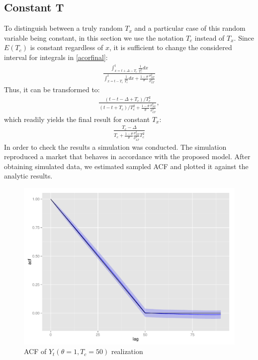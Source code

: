 \documentclass[12pt]{article}
\begin{document}
\subsection{Constant T}
To distinguish between a truly random $T_x$ and a particular case of this random variable being constant, in this section we use the notation $T_c$ instead of $T_x$. Since $E(T_c)$ is constant regardless of $x$, it is sufficient to change the considered interval for integrals in \eqref{acorfinal}:
\begin{equation*}
\begin{gathered}
\frac{\int_{x=t+\Delta-T_c}^{t}\frac{1}{T_c^2}dx}{\int_{x=t-T_c}^{t}\frac{1}{T_c^2}dx+\frac{1-\theta}{\theta}\frac{\sigma^2_{NT}}{\sigma^2_{LT}}}
\end{gathered}
\end{equation*}
Thus, it can be transformed to:
\begin{equation*}
\begin{gathered}
\frac{(t-t-\Delta+T_c)/T_c^2}{(t-t+T_c)/T_c^2+\frac{1-\theta}{\theta}\frac{\sigma^2_{NT}}{\sigma^2_{LT}}},
\end{gathered}
\end{equation*}
which readily yields the final result for constant $T_x$:
\begin{equation}\label{acorconst}
\begin{gathered}
\frac{T_c-\Delta}{T_c+\frac{1-\theta}{\theta}\frac{\sigma^2_{NT}}{\sigma^2_{LT}}T_c^2}
\end{gathered}
\end{equation}
In order to check the results a simulation was conducted. The simulation reproduced a market that behaves in accordance with the proposed model. After obtaining simulated data, we estimated sampled ACF and plotted it against the analytic results.
\begin{figure}[H]
  \centering
    \includegraphics[width=\textwidth]{acfcth1}
   \caption{ACF of $Y_t(\theta =1, T_c=50)$ realization}
   \label{fig:acfcth1} 
\end{figure}
\end{document}
